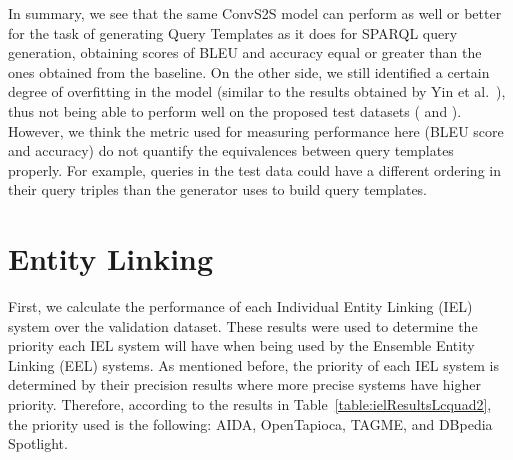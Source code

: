 In summary, we see that the same ConvS2S model can perform as well or better for the task of 
generating Query Templates as it does for SPARQL query generation, obtaining scores of BLEU and 
accuracy equal or greater than the ones obtained from the baseline. On the other side, we still 
identified a certain degree of overfitting in the model (similar to the results obtained by 
Yin et al.~\cite{nmt:nl-to-sparql-Yin19}), thus not being able to perform well on the proposed 
test datasets (\QALDseven{} and \WikiSPARQL{}). However, we think the metric used for measuring 
performance here (BLEU score and accuracy) do not quantify the equivalences between query 
templates properly. For example, queries in the test data could have a different ordering in 
their query triples than the generator uses to build query templates.

\section{Entity Linking}
\label{cap5:results/entityLinking}
First, we calculate the performance of each Individual Entity Linking (IEL) system over the 
validation \LCQuADtwo{} dataset. These results were used to determine the priority each IEL system 
will have when being used by the Ensemble Entity Linking (EEL) systems. As mentioned before, the 
priority of each IEL system is determined by their precision results where more precise systems 
have higher priority. Therefore, according to the results in Table~\ref{table:ielResultsLcquad2}, 
the priority used is the following: AIDA, OpenTapioca, TAGME, and DBpedia Spotlight.


